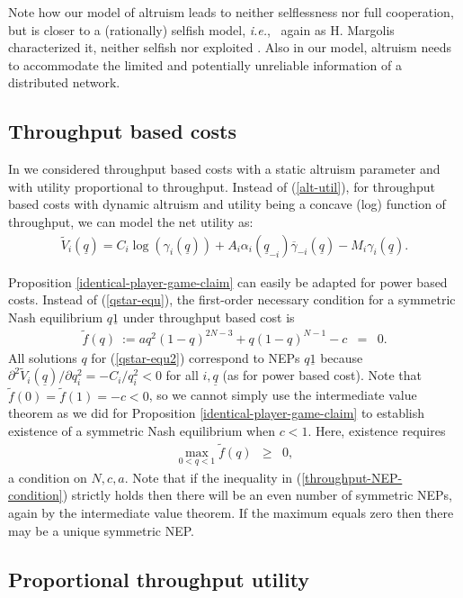 \documentclass[12pt,onecolumn,draftcls]{IEEEtran}
\newcommand{\ie}{{\em i.e.},~}
\newcommand{\uq}{\underline{q}}
\newcommand{\uone}{\underline{1}}
\newcommand{\be}{\begin{eqnarray}}
\newcommand{\ee}{\end{eqnarray}}
\begin{document}
Note how our model of altruism leads to neither selflessness nor full
cooperation,  but is closer to a (rationally) selfish model, \ie  
again
as H. Margolis characterized it, 
neither selfish nor exploited \cite{margolis07}.
Also in our model,
altruism needs to accommodate the limited and potentially unreliable
information of a distributed network.









\subsection{Throughput based costs}\label{throughput-costs}

In \cite{Kesidis10-cdc} we considered throughput based costs
with a static altruism parameter and with utility proportional to
throughput.  Instead of (\ref{alt-util}), for throughput based costs with
dynamic altruism and utility being a concave (log) function of throughput,
we can model the net utility as:
\be
\tilde{V}_i(\uq)   =   
C_i\log(\gamma_i(\uq))  + A_i \alpha_i(\uq_{-i})
\overline{\gamma}_{-i}(\uq) - M_i \gamma_i(\uq).
\label{alt-util2}
\ee

Proposition \ref{identical-player-game-claim} can easily be
adapted for power based
costs.  Instead of (\ref{qstar-equ}), the
first-order necessary condition for a symmetric Nash equilibrium $q\uone$
under throughput based cost  is
\be\label{qstar-equ2}
\tilde{f}(q) ~:= a q^2  (1-q)^{2N-3} +q(1-q)^{N-1}-c & = & 0.
\ee
All solutions $q$ for (\ref{qstar-equ2}) correspond to NEPs $q\uone$ because
$\partial^2 \tilde{V}_i(\uq) /\partial q_i^2 = -C_i/q_i^2 < 0$ for all $i,\uq$ 
(as for power based cost).
Note that 
$\tilde{f}(0)=\tilde{f}(1)=-c<0$, so we cannot simply use the intermediate
value theorem as we did for Proposition \ref{identical-player-game-claim}
to establish existence of a symmetric Nash equilibrium when $c<1$.  Here,
existence requires 
\be\label{throughput-NEP-condition}
\max_{0<q<1} \tilde{f}(q) & \geq & 0,
\ee
a condition on $N,c,a$.
Note that if the inequality in (\ref{throughput-NEP-condition}) strictly
holds then there will be an even number of symmetric NEPs, again by the
intermediate value theorem. If the maximum equals zero then there may be a
unique symmetric NEP.

\subsection{Proportional throughput utility}
\end{document}
